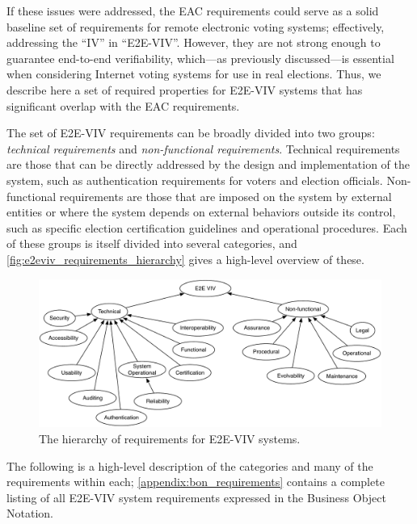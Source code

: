 If these issues were addressed, the EAC requirements could serve as a
solid baseline set of requirements for remote electronic voting
systems; effectively, addressing the ``IV'' in ``E2E-VIV''. However,
they are not strong enough to guarantee end-to-end verifiability,
which---as previously discussed---is essential when considering
Internet voting systems for use in real elections.  Thus, we describe
here a set of required properties for E2E-VIV systems that has
significant overlap with the EAC requirements.

The set of E2E-VIV requirements can be broadly divided into two
groups: \emph{technical requirements} and \emph{non-functional
  requirements}. Technical requirements are those that can be directly
addressed by the design and implementation of the system, such as
authentication requirements for voters and election
officials. Non-functional requirements are those that are imposed on
the system by external entities or where the system depends on
external behaviors outside its control, such as specific election
certification guidelines and operational procedures. Each of these
groups is itself divided into several categories, and
\autoref{fig:e2eviv_requirements_hierarchy} gives a high-level
overview of these.

\begin{figure}
\begin{center}
\includegraphics[width=6in]{required_properties_resources/hierarchy}
\end{center}
\caption{The hierarchy of requirements for E2E-VIV systems.}
\label{fig:e2eviv_requirements_hierarchy}
\end{figure}

The following is a high-level description of the categories and many
of the requirements within each; \autoref{appendix:bon_requirements}
contains a complete listing of all E2E-VIV system requirements
expressed in the Business Object Notation.

